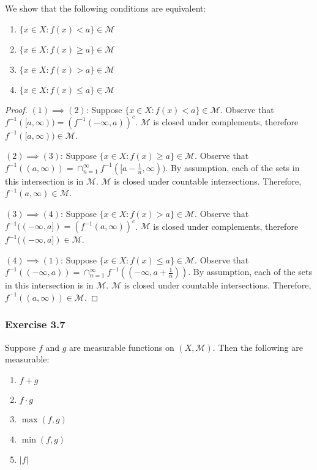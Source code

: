\documentclass[letterpaper,12pt]{article}
\theoremstyle{definition}
\begin{document}
We show that the following conditions are equivalent:
\begin{enumerate}
  \item $\{x \in X : f(x) < a \} \in \mathcal{M}$
  \item $\{x \in X : f(x) \geq a \} \in \mathcal{M}$
  \item $\{x \in X : f(x) > a \} \in \mathcal{M}$
  \item $\{x \in X : f(x) \leq a \} \in \mathcal{M}$
\end{enumerate}
\begin{proof}
  $(1) \implies (2)$: Suppose $\{x \in X : f(x) < a \} \in \mathcal{M}$. Observe that $f^{-1}([a, \infty)) = (f^{-1}(-\infty, a))^c$. $\mathcal{M}$ is closed under complements, therefore $f^{-1}([a, \infty)) \in \mathcal{M}$.

  $(2) \implies (3)$: Suppose $\{x \in X : f(x) \geq a \} \in \mathcal{M}$. Observe that $f^{-1}((a, \infty)) = \cap_{n=1}^{\infty} f^{-1}([a - \frac{1}{n}, \infty))$. By assumption, each of the sets in this intersection is in $\mathcal{M}$. $\mathcal{M}$ is closed under countable intersections. Therefore, $f^{-1}(a, \infty) \in \mathcal{M}$.

  $(3) \implies (4)$:  Suppose $\{x \in X : f(x) > a \} \in \mathcal{M}$. Observe that $f^{-1}((-\infty, a]) = (f^{-1}(a, \infty))^c$. $\mathcal{M}$ is closed under complements, therefore $f^{-1}((-\infty, a]) \in \mathcal{M}$.

  $(4) \implies (1)$: Suppose $\{x \in X : f(x) \leq a \} \in \mathcal{M}$. Observe that $f^{-1}((-\infty, a)) = \cap_{n=1}^{\infty} f^{-1}((-\infty, a + \frac{1}{n}))$. By assumption, each of the sets in this intersection is in $\mathcal{M}$. $\mathcal{M}$ is closed under countable intersections. Therefore, $f^{-1}((a, \infty)) \in \mathcal{M}$.
\end{proof}


\subsubsection*{Exercise 3.7}
Suppose $f$ and $g$ are measurable functions on $(X,\mathcal{M})$. Then the following are measurable:
\begin{enumerate}
	\item $f + g$
	\item $f \cdot g$
	\item $\max(f,g)$
	\item $\min(f,g)$
	\item $|f|$
\end{enumerate}
\end{document}
